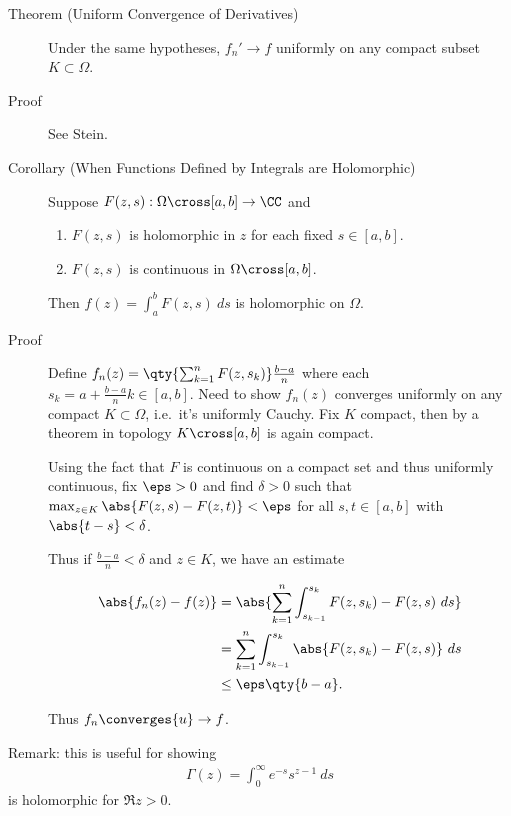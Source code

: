\begin{description}
\item[Theorem (Uniform Convergence of Derivatives)]
Under the same hypotheses, \(f_n' \to f\) uniformly on any compact
subset \(K \subset \Omega\).
\item[Proof]
See Stein.
\item[Corollary (When Functions Defined by Integrals are Holomorphic)]
Suppose \(F(z, s): \Omega \cross [a, b] \to \CC\) and

\begin{enumerate}
\def\labelenumi{\arabic{enumi}.}
\item
  \(F(z, s)\) is holomorphic in \(z\) for each fixed \(s \in [a, b]\).
\item
  \(F(z, s)\) is continuous in \(\Omega \cross [a, b]\).
\end{enumerate}

Then \(f(z) = \int_a^b F(z, s) ~ds\) is holomorphic on \(\Omega\).
\item[Proof]
Define \(f_n(z) = \qty{ \sum_{k=1}^n F(z, s_k) } \frac{b-a}{n}\) where
each \(s_k = a + \frac{b-a}{n} k \in [a, b]\). Need to show \(f_n(z)\)
converges uniformly on any compact \(K \subset \Omega\), i.e.~it's
uniformly Cauchy. Fix \(K\) compact, then by a theorem in topology
\(K \cross [a,b]\) is again compact.

Using the fact that \(F\) is continuous on a compact set and thus
uniformly continuous, fix \(\eps > 0\) and find \(\delta>0\) such that
\(\max_{z\in K} \abs{F(z, s) - F(z, t)} < \eps\) for all
\(s,t \in [a, b]\) with \(\abs{t-s} < \delta\).

Thus if \(\frac{b-a}{n} < \delta\) and \(z\in K\), we have an estimate

\begin{align*}
\abs{f_n(z) - f(z)} 
&= \abs{ \sum_{k=1}^n \int_{s_{k-1}}^{s_k} F(z, s_k) - F(z, s) ~ds } \\
&= \sum_{k=1}^n \int_{s_{k-1}}^{s_k} \abs{ F(z, s_k) - F(z, s) } ~ds \\
&\leq \eps \qty{b-a} 
.\end{align*}

Thus \(f_n \converges{u}\to f\).
\end{description}

Remark: this is useful for showing
\begin{align*}\Gamma(z) = \int_0^\infty e^{-s} s^{z-1} ~ds\end{align*}
is holomorphic for \(\Re z > 0\).

